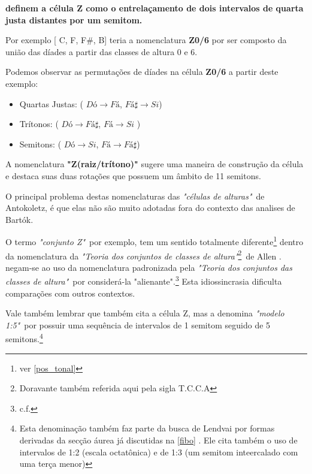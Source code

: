 \documentclass[
	12pt,				%
	openright,			%
	twoside,			%
	a4paper,			%
	english,			%
	french,				%
	spanish,			%
	brazil				%
	]{abntex2}
\begin{document}
 \textbf{definem a célula Z como o entrelaçamento de dois intervalos de quarta justa distantes por um semitom.} 

Por exemplo [ C, F, F\#, B] teria a nomenclatura \textbf{Z0/6} por ser composto da união das díades a partir das classes de altura 0 e 6. 

Podemos observar as permutações de díades na célula \textbf{Z0/6} a partir deste exemplo:

\begin{itemize}
\item Quartas Justas: ( $Dó \rightarrow Fá$, $Fá\sharp \rightarrow Si$) 

\item Trítonos: ( $Dó \rightarrow Fá\sharp$, $Fá \rightarrow Si$ )

\item Semitons: ( $Dó \rightarrow Si$, $Fá \rightarrow Fá\sharp$)
\end{itemize}


A nomenclatura \textbf{"Z(raiz/trítono)"} sugere uma maneira de construção da célula e destaca suas duas rotações que possuem um âmbito de 11 semitons. 

O principal problema destas nomenclaturas das \textit{"células de alturas"}\ de Antokoletz, é que elas não são muito adotadas fora do contexto das analises de Bartók.

O termo \textit{"conjunto Z"}\, por exemplo, tem um sentido totalmente diferente\footnote{ver \autoref{pos_tonal} } dentro da nomenclatura da  \textit{"Teoria dos conjuntos de classes de altura"}\footnote{Doravante também referida aqui pela sigla T.C.C.A}\ de Allen .  negam-se ao uso da nomenclatura padronizada pela \textit{"Teoria dos conjuntos das classes de altura"}\ por considerá-la "alienante".\footnote{c.f. } Esta idiossincrasia dificulta comparações com outros contextos.

Vale também lembrar que \cite[p. 51]{lendvai1971bela} também cita a célula Z, mas a denomina \textit{"modelo 1:5"}\ por possuir uma sequência de intervalos de 1 semitom seguido de 5 semitons.\footnote{Esta denominação também faz parte da busca de Lendvai por formas derivadas da secção áurea já discutidas na \autoref{fibo} . Ele cita também o uso de intervalos de 1:2 (escala octatônica) e de 1:3 (um semitom inteercalado com uma terça menor) } 
\end{document}
